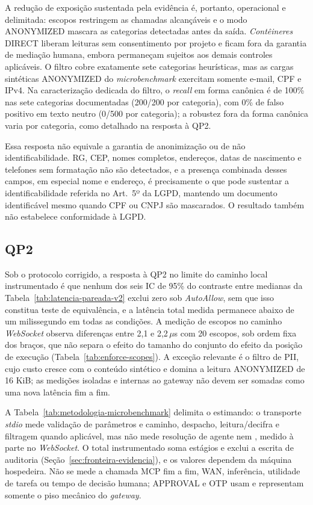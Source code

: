 \documentclass[12pt,openright,twoside,a4paper,english,brazil]{abntex2}
\newcommand{\micro}{\,$\mu$s}
\begin{document}
A redução de exposição sustentada pela evidência é, portanto, operacional e delimitada: escopos restringem as chamadas alcançáveis e o modo ANONYMIZED mascara as categorias detectadas antes da saída. \textit{Contêineres} DIRECT liberam leituras sem consentimento por projeto e ficam fora da garantia de mediação humana, embora permaneçam sujeitos aos demais controles aplicáveis. O filtro cobre exatamente sete categorias heurísticas, mas as cargas sintéticas ANONYMIZED do \textit{microbenchmark} exercitam somente e-mail, CPF e IPv4. Na caracterização dedicada do filtro, o \textit{recall} em forma canônica é de 100\% nas sete categorias documentadas (200/200 por categoria), com 0\% de falso positivo em texto neutro (0/500 por categoria); a robustez fora da forma canônica varia por categoria, como detalhado na resposta à QP2.

Essa resposta não equivale a garantia de anonimização ou de não identificabilidade. RG, CEP, nomes completos, endereços, datas de nascimento e telefones sem formatação não são detectados, e a presença combinada desses campos, em especial nome e endereço, é precisamente o que pode sustentar a identificabilidade referida no Art.~5º da LGPD, mantendo um documento identificável mesmo quando CPF ou CNPJ são mascarados. O resultado também não estabelece conformidade à LGPD.

\subsection{QP2}
Sob o protocolo corrigido, a resposta à QP2 no limite do caminho local instrumentado é que nenhum dos seis IC de 95\% do contraste entre medianas da Tabela~\ref{tab:latencia-pareada-v2} exclui zero sob \textit{AutoAllow}, sem que isso constitua teste de equivalência, e a latência total medida permanece abaixo de um milissegundo em todas as condições. A medição de escopos no caminho \textit{WebSocket} observa diferenças entre 2,1 e 2,2\micro{} com 20 escopos, sob ordem fixa dos braços, que não separa o efeito do tamanho do conjunto do efeito da posição de execução (Tabela~\ref{tab:enforce-scopes}). A exceção relevante é o filtro de PII, cujo custo cresce com o conteúdo sintético e domina a leitura ANONYMIZED de 16 KiB; as medições isoladas e internas ao gateway não devem ser somadas como uma nova latência fim a fim.

A Tabela~\ref{tab:metodologia-microbenchmark} delimita o estimando: o transporte \textit{stdio} mede validação de parâmetros e caminho, despacho, leitura/decifra e filtragem quando aplicável, mas não mede resolução de agente nem , medido à parte no \textit{WebSocket}. O total instrumentado soma estágios e exclui a escrita de auditoria (Seção~\ref{sec:fronteira-evidencia}), e os valores dependem da máquina hospedeira. Não se mede a chamada MCP fim a fim, WAN, inferência, utilidade de tarefa ou tempo de decisão humana; APPROVAL e OTP usam  e representam somente o piso mecânico do \textit{gateway}.
\end{document}
